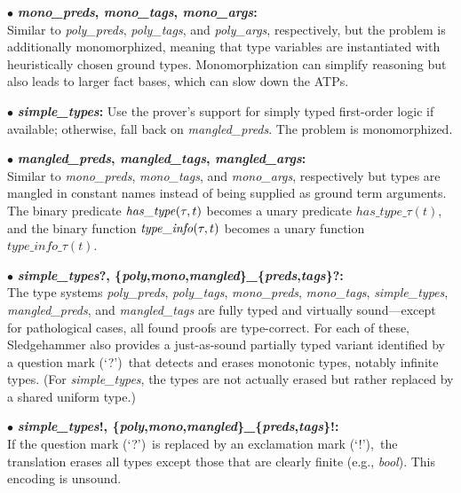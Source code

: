 \documentclass[a4paper,12pt]{article}
\begin{document}
\begin{enum}
\begin{enum}
\item[$\bullet$]
\textbf{%
\textit{mono\_preds},
\textit{mono\_tags},
\textit{mono\_args}:} \\
Similar to \textit{poly\_preds}, \textit{poly\_tags}, and \textit{poly\_args},
respectively, but the problem is additionally monomorphized, meaning that type
variables are instantiated with heuristically chosen ground types.
Monomorphization can simplify reasoning but also leads to larger fact bases,
which can slow down the ATPs.

\item[$\bullet$] \textbf{\textit{simple\_types}:} Use the prover's support for
simply typed first-order logic if available; otherwise, fall back on
\textit{mangled\_preds}. The problem is monomorphized.

\item[$\bullet$]
\textbf{%
\textit{mangled\_preds},
\textit{mangled\_tags},
\textit{mangled\_args}:} \\
Similar to
\textit{mono\_preds}, \textit{mono\_tags}, and \textit{mono\_args},
respectively but types are mangled in constant names instead of being supplied
as ground term arguments. The binary predicate $\mathit{has\_type\/}(\tau, t)$
becomes a unary predicate $\mathit{has\_type\_}\tau(t)$, and the binary function
$\mathit{type\_info\/}(\tau, t)$ becomes a unary function
$\mathit{type\_info\_}\tau(t)$.

\item[$\bullet$]
\textbf{%
\textit{simple\_types}?,
\{\textit{poly},\textit{mono},\textit{mangled}\}\textit{\_}\{\textit{preds},\textit{tags}\}?:} \\
The type systems \textit{poly\_preds}, \textit{poly\_tags},
\textit{mono\_preds}, \textit{mono\_tags}, \textit{simple\_types},
\textit{mangled\_preds}, and \textit{mangled\_tags} are fully typed and
virtually sound---except for pathological cases, all found proofs are
type-correct. For each of these, Sledgehammer also provides a just-as-sound
partially typed variant identified by a question mark (`{?}')\ that detects and
erases monotonic types, notably infinite types. (For \textit{simple\_types}, the
types are not actually erased but rather replaced by a shared uniform type.)

\item[$\bullet$]
\textbf{%
\textit{simple\_types}!,
\{\textit{poly},\textit{mono},\textit{mangled}\}\textit{\_}\{\textit{preds},\textit{tags}\}!:} \\
If the question mark (`{?}')\ is replaced by an exclamation mark (`{!}'),\ the
translation erases all types except those that are clearly finite (e.g.,
\textit{bool}). This encoding is unsound.


\end{enum}
\end{enum}
\end{document}
